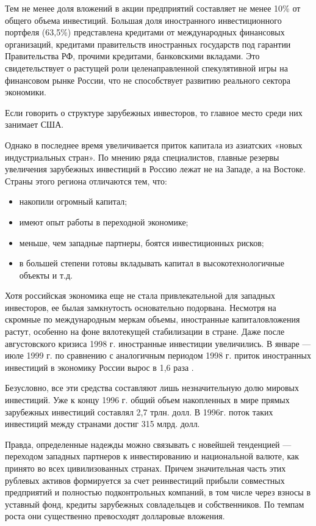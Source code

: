Тем не менее доля вложений в акции предприятий составляет не менее 10\% от общего объема инвестиций. Большая доля иностранного инвестиционного портфеля (63,5\%) представлена кредитами от международных финансовых организаций, кредитами правительств иностранных государств под гарантии Правительства РФ, прочими кредитами, банковскими вкладами. Это свидетельствует о растущей роли целенаправленной спекулятивной игры на финансовом рынке России, что не способствует развитию реального сектора экономики.

Если говорить о структуре зарубежных инвесторов, то главное место среди них занимает США.

Однако в последнее время увеличивается приток капитала из азиатских «новых индустриальных стран». По мнению ряда специалистов, главные резервы увеличения зарубежных инвестиций в Россию лежат не на Западе, а на Востоке. Страны этого региона отличаются тем, что:
\begin{itemize}
	\item накопили огромный капитал;
\item имеют опыт работы в переходной экономике;
\item меньше, чем западные партнеры, боятся инвестиционных рисков;
\item в большей степени готовы вкладывать капитал в высокотехнологичные объекты и т.д.
\end{itemize}

Хотя российская экономика еще не стала привлекательной для западных инвесторов, ее былая замкнутость основательно подорвана. Несмотря на скромные по международным меркам объемы, иностранные капиталовложения растут, особенно на фоне вялотекущей стабилизации в стране. Даже после августовского кризиса 1998 г. иностранные инвестиции увеличились. В январе  --- июле 1999 г. по сравнению с аналогичным периодом 1998 г. приток иностранных инвестиций в экономику России вырос в 1,6 раза .

Безусловно, все эти средства составляют лишь незначительную долю мировых инвестиций. Уже к концу 1996 г. общий объем накопленных в мире прямых зарубежных инвестиций составлял 2,7 трлн. долл. В 1996г. поток таких инвестиций между странами достиг 315 млрд. долл. 

Правда, определенные надежды можно связывать с новейшей тенденцией  --- переходом западных партнеров к инвестированию и национальной валюте, как принято во всех цивилизованных странах. Причем значительная часть этих рублевых активов формируется за счет реинвестиций прибыли совместных предприятий и полностью подконтрольных компаний, в том числе через взносы в уставный фонд, кредиты зарубежных совладельцев и собственников. По темпам роста они существенно превосходят долларовые вложения.

